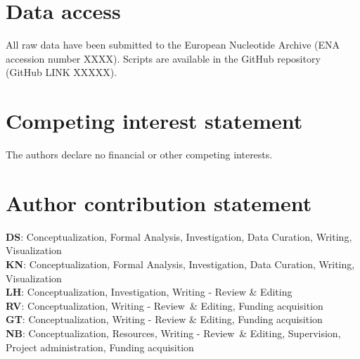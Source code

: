 \documentclass[twocolumn]{bmcart}%
\begin{document}


\begin{backmatter}

\section*{Data access}%
All raw data have been submitted to the European Nucleotide Archive (ENA accession number XXXX). Scripts are available in the GitHub repository (GitHub LINK XXXXX).

\section*{Competing interest statement}%
The authors declare no financial or other competing interests.

\section*{Author contribution statement}%
\textbf{DS}: Conceptualization, Formal Analysis, Investigation, Data Curation, Writing, Visualization \\
\textbf{KN}: Conceptualization, Formal Analysis, Investigation, Data Curation, Writing, Visualization \\
\textbf{LH}: Conceptualization, Investigation, Writing - Review \& Editing \\
\textbf{RV}: Conceptualization, Writing - Review \& Editing, Funding acquisition \\
\textbf{GT}: Conceptualization, Writing - Review \& Editing, Funding acquisition \\
\textbf{NB}: Conceptualization, Resources, Writing - Review \& Editing, Supervision, Project administration, Funding acquisition


\end{backmatter}
\end{document}
